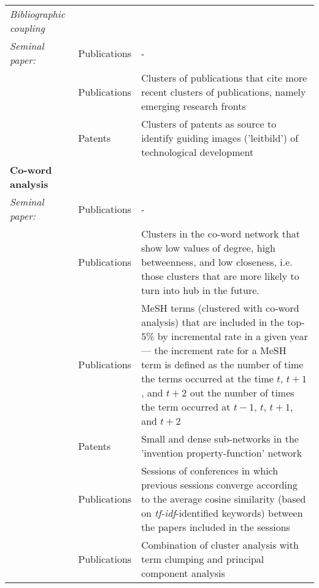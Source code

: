 \documentclass[11pt]{article}
\begin{document}
{\begin{landscape}
\begin{spacing}{0.8}
\begin{longtable}{p{6cm}p{2.7cm}p{13cm}}
\textit{Bibliographic coupling}\\
\addtolength{\leftskip}{1em}\noindent		\textit{Seminal paper:} \cite{Kessler1963}&  Publications&  	-\\[1ex]
\addtolength{\leftskip}{1em}\noindent		\cite{Morris2003}&	Publications&	Clusters of publications that cite more recent clusters of publications, namely emerging research fronts \\[1ex]
\addtolength{\leftskip}{1em}\noindent		\cite{Kuusi2007}&	Patents&		Clusters of patents as source to identify guiding images ('leitbild') of technological development\\[1ex]
\hline


\textbf{Co-word analysis}\\
\addtolength{\leftskip}{1em}\noindent		\textit{Seminal paper:} \cite{Callon1983}&  		Publications&  		-\\[1ex]
\addtolength{\leftskip}{1em}\noindent		\cite{Lee2008}&  		Publications&  			Clusters in the co-word network that show low values of degree, high betweenness, and low closeness, i.e. those clusters that are more likely to turn into hub in the future. \\[1ex]
\addtolength{\leftskip}{1em}\noindent		\cite{Ohniwa2010}&  		Publications&  		 MeSH terms (clustered with co-word analysis) that are included in the top-5\% by incremental rate in a given year --- the increment rate for a MeSH term is defined as the number of time the terms occurred at the time $t$, $t+1$, and $t+2$ out the number of times the term occurred at $t-1$, $t$, $t+1$, and $t+2$\\[1ex]
\addtolength{\leftskip}{1em}\noindent		\cite{Yoon2011}&  		Patents&  			Small and dense sub-networks in the 'invention property-function' network\\[1ex]
\addtolength{\leftskip}{1em}\noindent		\cite{Furukawa2015}&  	Publications&  		Sessions of conferences in which previous sessions converge according to the average cosine similarity (based on \textit{tf-idf}-identified keywords) between the papers included in the sessions\\[1ex]
\addtolength{\leftskip}{1em}\noindent		\cite{Zhang2014}&  		Publications&  		Combination of cluster analysis with term clumping and principal component analysis\\[1ex]

\hline


\end{longtable}
\end{spacing}
\end{landscape}}
\end{document}
